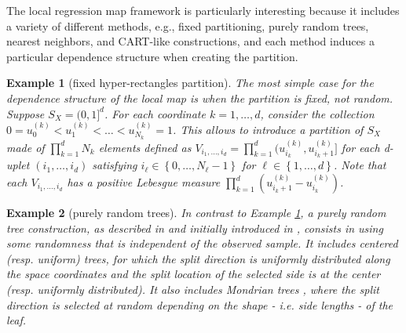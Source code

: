 \documentclass[paper=a4, fontsize=11pt]{scrartcl}
\newtheorem{example}{Example}
\begin{document}
The local regression map framework is particularly interesting because it includes a variety of different methods, e.g., fixed partitioning,  purely random trees, nearest neighbors, and CART-like constructions, and each method induces a particular dependence structure when creating the partition. 


\begin{example}[fixed hyper-rectangles partition]\label{ex1}
    The most simple case for the dependence structure of the local map is when the partition is fixed, not random. Suppose $S_X= (0,1]^d$. For each coordinate $k =1,\ldots, d$, consider the collection $0 = u_0^{(k)} < u_1^{(k)} < \ldots < u_{N_k}^{(k)} = 1$. This allows to introduce a partition of $S_X$ made of $ \prod_{k=1} ^d N_k $ elements defined as $ V_{i_1,\ldots, i_d} =  \prod_{ k = 1 }^d (u_{i_k}^{(k)}, u_{i_k + 1 }^{(k)} ]$ for each d-uplet $(i_1,\ldots, i_d)$ satisfying $i_\ell\in \left\{0,\ldots,N_\ell-1 \right\}$ for $\ell\in \left\{1,\ldots,d \right\}$. Note that each $V_{i_1,\ldots, i_d}$ has a positive Lebesgue measure $ \prod_{ k = 1 }^d (u_{i_k + 1 }^{(k)} - u_{i_k}^{(k)} )$.
\end{example} 

\begin{example}[purely random trees]
In contrast to Example \ref{ex1}, a \textit{purely random tree} construction, as described in \cite{arlot2014analysis} and initially introduced in \cite{breiman2000some},  consists in using some randomness that is independent of the observed sample. It includes centered (resp. uniform) trees, for which the split direction is uniformly distributed along the space coordinates and the split location of the selected side is at the center (resp. uniformly distributed).  It also includes Mondrian trees \citep{lakshminarayanan2014mondrian}, where the split direction is selected at random depending on the shape - i.e. side lengths - of the leaf.  %
\end{example}
\end{document}

